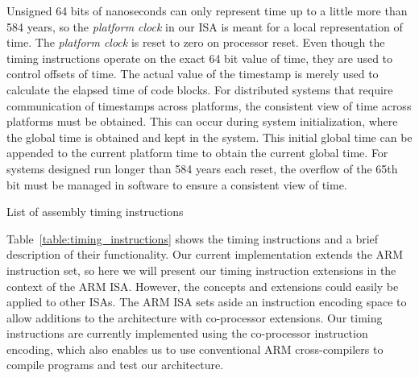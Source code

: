 Unsigned 64 bits of nanoseconds can only represent time up to a little more than 584 years, so the \emph{platform clock} in our ISA is meant for a local representation of time. 
The \emph{platform clock} is reset to zero on processor reset. 
Even though the timing instructions operate on the exact 64 bit value of time, they are used to control offsets of time. 
The actual value of the timestamp is merely used to calculate the elapsed time of code blocks.
For distributed systems that require communication of timestamps across platforms, the consistent view of time across platforms must be obtained. 
This can occur during system initialization, where the global time is obtained and kept in the system.  
This initial global time can be appended to the current platform time to obtain the current global time. 
For systems designed run longer than 584 years each reset, the overflow of the 65th bit must be managed in software to ensure a consistent view of time.


\begin{table}[h]
\noindent{}
\caption{List of assembly timing instructions}
\label{table:timing_instructions}
\end{table}

Table~\ref{table:timing_instructions} shows the timing instructions and a brief description of their functionality.   
Our current implementation extends the ARM~\cite{armrefman} instruction set, so here we will present our timing instruction extensions in the context of the ARM ISA.
However, the concepts and extensions could easily be applied to other ISAs. 
The ARM ISA sets aside an instruction encoding space to allow additions to the architecture with co-processor extensions. 
Our timing instructions are currently implemented using the co-processor instruction encoding, which also enables us to use conventional ARM cross-compilers to compile programs and test our architecture.     

